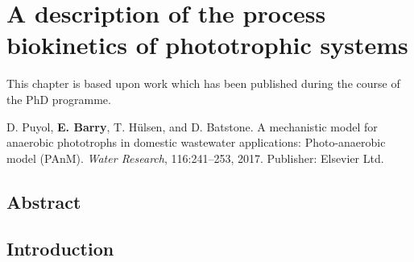 \chapter[A description of the process biokinetics of phototrophic systems]{A description of the process biokinetics of phototrophic systems}
\label{Chap:chap2}	%
\pagestyle{headings}

This chapter is based upon work which has been published during the course of the PhD programme.

D. Puyol, \textbf{E. Barry}, T. H\"{u}lsen, and D. Batstone. A mechanistic model for anaerobic phototrophs
in domestic wastewater applications: Photo-anaerobic model (PAnM).
\textit{Water Research}, 116:241–253, 2017. Publisher: Elsevier Ltd.

\section*{Abstract}


\section{Introduction}
\label{Sec:chap2_intro}

